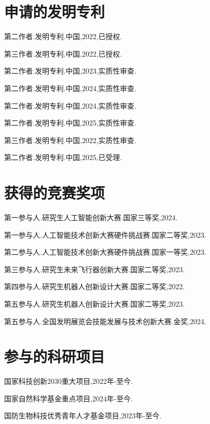 \begin{resume}
  \section*{申请的发明专利} %
  \begin{enumerate}[label={[\arabic*]},labelsep=6pt,topsep=0pt,partopsep=0pt,
parsep=0pt,itemsep=1pt,leftmargin=0em,itemindent=42pt]
  \item 第二作者.发明专利.中国,2022,已授权.
  \item 第三作者.发明专利.中国,2022,已授权.
  \item 第二作者.发明专利.中国,2023,实质性审查.
  \item 第二作者.发明专利.中国,2024,实质性审查.
  \item 第二作者.发明专利.中国,2024,实质性审查.
  \item  第二作者.发明专利.中国,2025,实质性审查.
  \item 第三作者.发明专利.中国,2022,实质性审查.
  \item 第二作者.发明专利.中国,2025,已受理.
  \end{enumerate}

  \section*{获得的竞赛奖项} %

\begin{enumerate}[label={[\arabic*]},labelsep=6pt,topsep=0pt,partopsep=0pt,
parsep=0pt,itemsep=1pt,leftmargin=0em,itemindent=42pt]
\normalsize
\item 第一参与人.研究生人工智能创新大赛.国家三等奖,2024.
\item 第一参与人.人工智能技术创新大赛硬件挑战赛.国家二等奖,2023.
\item 第二参与人.人工智能技术创新大赛硬件挑战赛.国家一等奖,2023.
\item 第三参与人.研究生未来飞行器创新大赛.国家二等奖,2023.
\item 第四参与人.研究生机器人创新设计大赛.国家二等奖,2022.
\item 第五参与人.研究生机器人创新设计大赛.国家二等奖,2023.
\item 第五参与人.全国发明展览会技能发展与技术创新大赛.金奖,2024.
\end{enumerate}

\section*{参与的科研项目} %

  \begin{enumerate}[label={[\arabic*]},labelsep=6pt,topsep=0pt,partopsep=0pt,
  parsep=0pt,itemsep=1pt,leftmargin=0em,itemindent=42pt]
  \normalsize
  \item 国家科技创新2030重大项目,2022年-至今.
  \item 国家自然科学基金重点项目,2024年-至今.
  \item 国防生物科技优秀青年人才基金项目,2023年-至今.
  \end{enumerate}

\fi
\fi
\end{resume}


